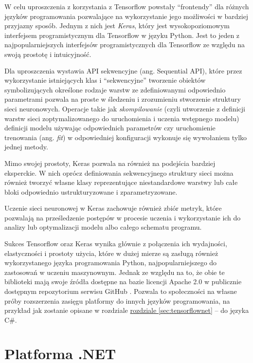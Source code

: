 W celu uproszczenia z korzystania z Tensorflow powstały ``frontendy'' dla różnych języków programowania pozwalające na wykorzystanie jego możliwości w bardziej przyjazny sposób.
Jednym z nich jest \emph{Keras}, który jest wysokopoziomowym interfejsem programistycznym dla Tensorflow w języku Python.
Jest to jeden z najpopularniejszych interfejsów programistycznych dla Tensorflow ze względu na swoją prostotę i intuicyjność.

Dla uproszczenia wystawia API sekwencyjne (ang. Sequential API), które przez wykorzystanie istniejących klas i ``sekwencyjne'' tworzenie obiektów symbolizujących określone rodzaje warstw ze zdefiniowanymi odpowiednio parametrami pozwala na proste w śledzeniu i zrozumieniu stworzenie struktury sieci neuronowych.
Operacje takie jak \emph{skompilowanie} (czyli utworzenie z definicji warstw sieci zoptymalizowanego do uruchomienia i uczenia wstępnego modelu) definicji modelu używając odpowiednich parametrów czy uruchomienie trenowania (ang. \emph{fit}) w odpowiedniej konfiguracji wykonuje się wywołaniem tylko  jednej metody.

Mimo swojej prostoty, Keras pozwala na również na podejścia bardziej eksperckie.
W nich oprócz definiowania sekwencyjnego struktury sieci można również tworzyć własne klasy reprezentujące niestandardowe warstwy lub całe bloki odpowiednio ustrukturyzowane i zparametryzowane.

Uczenie sieci neuronowej w Keras zachowuje również zbiór metryk, które pozwalają na prześledzenie postępów w procesie uczenia i wykorzystanie ich do analizy lub optymalizacji modelu albo całego schematu programu.

Sukces Tensorflow oraz Keras wynika głównie z połączenia ich wydajności, elastyczności i prostoty użycia, które w dużej mierze są zasługą również wykorzystanego języka programowania Python, najpopularniejszego do zastosowań w uczeniu maszynownym.
Jednak ze względu na to, że obie te biblioteki mają swoje źródła dostępne na bazie licencji Apache 2.0 w publicznie dostępnym repozytorium serwisu GitHub \cite{tensorflow}.
Pozwala to społeczności na własne próby rozszerzenia zasięgu platformy do innych języków programowania, na przykład jak zostanie opisane w rozdziale \hyperref[sec:tensorflownet]{rozdziale \ref*{sec:tensorflownet}} -- do języka C\#.

\section{Platforma .NET}

